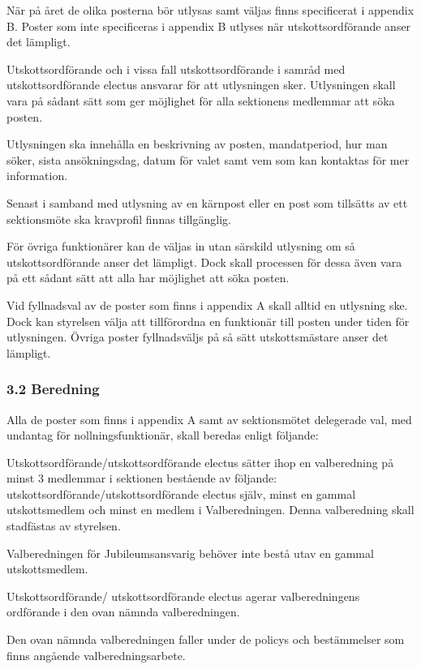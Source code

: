 \documentclass{dsekkallelse}
\begin{document}
När på året de olika posterna bör utlysas samt väljas finns specificerat i appendix B. Poster som inte specificeras i appendix B utlyses när utskottsordförande anser det lämpligt. 

Utskottsordförande och i vissa fall utskottsordförande i samråd med utskottsordförande electus ansvarar för att utlysningen sker. Utlysningen skall vara på sådant sätt som ger möjlighet för alla sektionens medlemmar att söka posten. 

Utlysningen ska innehålla en beskrivning av posten, mandatperiod, hur man söker, sista ansökningsdag, datum för valet samt vem som kan kontaktas för mer information. 

Senast i samband med utlysning av en kärnpost eller en post som tillsätts av ett sektionsmöte ska kravprofil finnas tillgänglig.

För övriga funktionärer kan de väljas in utan särskild utlysning om så utskottsordförande anser det lämpligt. Dock skall processen för dessa även vara på ett sådant sätt att alla har möjlighet att söka posten. 

Vid fyllnadsval av de poster som finns i appendix A skall alltid en utlysning ske. Dock kan styrelsen välja att tillförordna en funktionär till posten under tiden för utlysningen. Övriga poster fyllnadsväljs på så sätt utskottsmästare anser det lämpligt. 

\subsubsection{3.2 Beredning}

Alla de poster som finns i appendix A samt av sektionsmötet delegerade val, med undantag för nollningsfunktionär, skall beredas enligt följande:

Utskottsordförande/utskottsordförande electus sätter ihop en valberedning på minst 3 medlemmar i sektionen bestående av följande: utskottsordförande/utskottsordförande electus själv, minst en gammal utskottsmedlem och minst en medlem i Valberedningen. Denna valberedning skall stadfästas av styrelsen.

Valberedningen för Jubileumsansvarig behöver inte bestå utav en gammal utskottsmedlem.

Utskottsordförande/ utskottsordförande electus agerar valberedningens ordförande i den ovan nämnda valberedningen. 

Den ovan nämnda valberedningen faller under de policys och bestämmelser som finns angående valberedningsarbete. 
\end{document}
